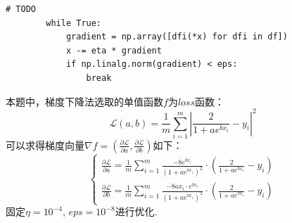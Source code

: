 \documentclass[UTF8,ctexart,a4paper,11pt,openany]{article}
\theoremstyle{definition}
\begin{document}
    \begin{lstlisting}[aboveskip=0pt]
        # TODO   
        while True:
            gradient = np.array([dfi(*x) for dfi in df])
            x -= eta * gradient
            if np.linalg.norm(gradient) < eps:
                break
    \end{lstlisting}
    \par 本题中，梯度下降法选取的单值函数$f$为$loss$函数：$$\mathcal{L}(a, b)=\frac{1}{m} \sum_{i=1}^{m}\left|\frac{2}{1+a e^{b x_{i}}}-y_{i}\right|^{2}$$可以求得梯度向量$\nabla f=(\frac{\partial \mathcal{L}}{\partial a},\frac{\partial \mathcal{L}}{\partial b})$如下：$$\left\{\begin{array}{l}
        \frac{\partial \mathcal{L}}{\partial a} = \frac{1}{m} \sum_{i=1}^{m} \frac{-8e^{b x_{i}}}{\left(1+a e^{b x_{i}}\right)^2}  \cdot \left(\frac{2}{1+a e^{b x_{i}}} - y_{i}\right) \\
        \frac{\partial \mathcal{L}}{\partial b} = \frac{1}{m} \sum_{i=1}^{m} \frac{-8ax_i\cdot e^{b x_{i}}}{\left(1+a e^{b x_{i}}\right)^2} \cdot \left(\frac{2}{1+a e^{b x_{i}}} - y_{i}\right)
        \end{array}\right.$$
    固定$\eta=10^{-4}$, $eps=10^{-8}$进行优化. 
\end{document}
